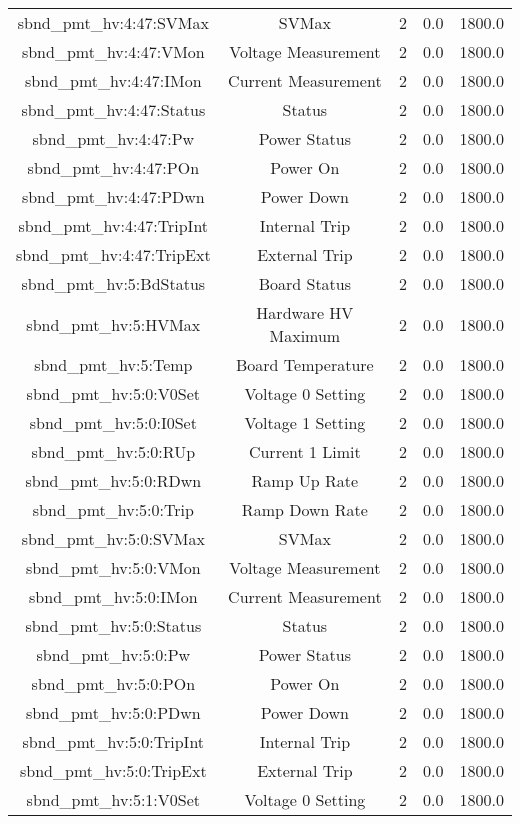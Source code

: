 \begin{table}[ptb]
\begin{tabular}{c | c c c c}
sbnd_pmt_hv:4:47:SVMax & SVMax & 2 & 0.0 & 1800.0\\ 
sbnd_pmt_hv:4:47:VMon & Voltage Measurement & 2 & 0.0 & 1800.0\\ 
sbnd_pmt_hv:4:47:IMon & Current Measurement & 2 & 0.0 & 1800.0\\ 
sbnd_pmt_hv:4:47:Status & Status & 2 & 0.0 & 1800.0\\ 
sbnd_pmt_hv:4:47:Pw & Power Status & 2 & 0.0 & 1800.0\\ 
sbnd_pmt_hv:4:47:POn & Power On & 2 & 0.0 & 1800.0\\ 
sbnd_pmt_hv:4:47:PDwn & Power Down & 2 & 0.0 & 1800.0\\ 
sbnd_pmt_hv:4:47:TripInt & Internal Trip & 2 & 0.0 & 1800.0\\ 
sbnd_pmt_hv:4:47:TripExt & External Trip & 2 & 0.0 & 1800.0\\ 
sbnd_pmt_hv:5:BdStatus & Board Status & 2 & 0.0 & 1800.0\\ 
sbnd_pmt_hv:5:HVMax & Hardware HV Maximum & 2 & 0.0 & 1800.0\\ 
sbnd_pmt_hv:5:Temp & Board Temperature & 2 & 0.0 & 1800.0\\ 
sbnd_pmt_hv:5:0:V0Set & Voltage 0 Setting & 2 & 0.0 & 1800.0\\ 
sbnd_pmt_hv:5:0:I0Set & Voltage 1 Setting & 2 & 0.0 & 1800.0\\ 
sbnd_pmt_hv:5:0:RUp & Current 1 Limit & 2 & 0.0 & 1800.0\\ 
sbnd_pmt_hv:5:0:RDwn & Ramp Up Rate & 2 & 0.0 & 1800.0\\ 
sbnd_pmt_hv:5:0:Trip & Ramp Down Rate & 2 & 0.0 & 1800.0\\ 
sbnd_pmt_hv:5:0:SVMax & SVMax & 2 & 0.0 & 1800.0\\ 
sbnd_pmt_hv:5:0:VMon & Voltage Measurement & 2 & 0.0 & 1800.0\\ 
sbnd_pmt_hv:5:0:IMon & Current Measurement & 2 & 0.0 & 1800.0\\ 
sbnd_pmt_hv:5:0:Status & Status & 2 & 0.0 & 1800.0\\ 
sbnd_pmt_hv:5:0:Pw & Power Status & 2 & 0.0 & 1800.0\\ 
sbnd_pmt_hv:5:0:POn & Power On & 2 & 0.0 & 1800.0\\ 
sbnd_pmt_hv:5:0:PDwn & Power Down & 2 & 0.0 & 1800.0\\ 
sbnd_pmt_hv:5:0:TripInt & Internal Trip & 2 & 0.0 & 1800.0\\ 
sbnd_pmt_hv:5:0:TripExt & External Trip & 2 & 0.0 & 1800.0\\ 
sbnd_pmt_hv:5:1:V0Set & Voltage 0 Setting & 2 & 0.0 & 1800.0\\ 

\end{tabular}
\end{table}
